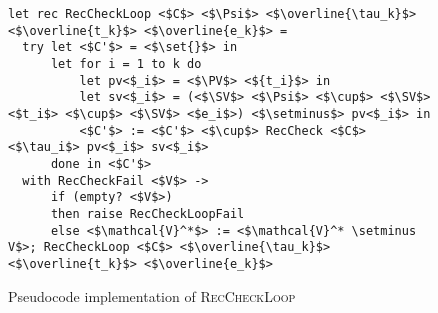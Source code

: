 \begin{figure}
\centering

\begin{verbatim}
let rec RecCheckLoop <$C$> <$\Psi$> <$\overline{\tau_k}$> <$\overline{t_k}$> <$\overline{e_k}$> =
  try let <$C'$> = <$\set{}$> in
      let for i = 1 to k do
          let pv<$_i$> = <$\PV$> <${t_i}$> in
          let sv<$_i$> = (<$\SV$> <$\Psi$> <$\cup$> <$\SV$> <$t_i$> <$\cup$> <$\SV$> <$e_i$>) <$\setminus$> pv<$_i$> in
          <$C'$> := <$C'$> <$\cup$> RecCheck <$C$> <$\tau_i$> pv<$_i$> sv<$_i$>
      done in <$C'$>
  with RecCheckFail <$V$> ->
      if (empty? <$V$>)
      then raise RecCheckLoopFail
      else <$\mathcal{V}^*$> := <$\mathcal{V}^* \setminus V$>; RecCheckLoop <$C$> <$\overline{\tau_k}$> <$\overline{t_k}$> <$\overline{e_k}$>
\end{verbatim}

\caption{Pseudocode implementation of \textsc{RecCheckLoop}}
\label{fig:helpers}
\end{figure}

